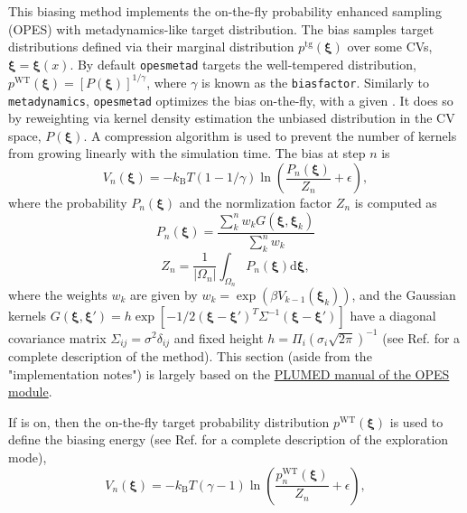 
This biasing method implements the on-the-fly probability enhanced sampling (OPES) with metadynamics-like target distribution.\cite{Invernizzi2020}
The bias samples target distributions defined via their marginal distribution
$p^{\mathrm{tg}}(\boldsymbol{\xi})$ over some CVs, $\boldsymbol{\xi} = \boldsymbol{\xi}(x)$.
By default \texttt{opes{\textunderscore}metad} targets the well-tempered distribution, $p^{\mathrm{WT}}(\boldsymbol{\xi}) = [P(\boldsymbol{\xi})]^{1/\gamma}$, where $\gamma$ is known as the \texttt{biasfactor}.
Similarly to \texttt{metadynamics}, \texttt{opes{\textunderscore}metad} optimizes the bias on-the-fly, with a given .
It does so by reweighting via kernel density estimation the unbiased distribution in the CV space, $P(\boldsymbol{\xi})$.
A compression algorithm is used to prevent the number of kernels from growing linearly with the simulation time.
The bias at step $n$ is
\begin{equation}\label{eq:opes_potential}
V_n(\boldsymbol{\xi}) = -k_{\mathrm{B}}T(1-1/\gamma)\ln\left(\frac{P_n(\boldsymbol{\xi})}{Z_n}+\epsilon\right),
\end{equation}
where the probability $P_n (\boldsymbol{\xi})$ and the normlization factor $Z_n$ is computed as
\begin{equation}
P_n (\boldsymbol{\xi}) = \frac{\sum_k^n w_k G(\boldsymbol{\xi}, \boldsymbol{\xi}_k)}{\sum_k^n w_k}
\end{equation}
\begin{equation}
Z_n = \frac{1}{|\Omega_n|}\int_{\Omega_n} P_n (\boldsymbol{\xi}) \mathrm{d}\boldsymbol{\xi},
\end{equation}
where the weights $w_k$ are given by $w_k = \exp(\beta V_{k-1}(\boldsymbol{\xi}_k))$, and the Gaussian kernels
$G(\boldsymbol{\xi}, \boldsymbol{\xi}')=h\exp\left[-1/2(\boldsymbol{\xi}-\boldsymbol{\xi}')^T \Sigma^{-1}(\boldsymbol{\xi}-\boldsymbol{\xi}')\right]$ have a diagonal covariance matrix $\Sigma_{ij}=\sigma^2 \delta_{ij}$ and fixed height $h=\Pi_i (\sigma_i \sqrt{2\pi})^{-1}$ (see Ref.\cite{Invernizzi2020} for a complete description of the method). This section (aside from the "implementation notes") is largely based on the \href{https://www.plumed.org/doc-master/user-doc/html/_o_p_e_s__m_e_t_a_d__e_x_p_l_o_r_e.html}{PLUMED manual of the OPES module}.

If  is on, then the on-the-fly target probability distribution $p^{\mathrm{WT}}(\boldsymbol{\xi})$ is used to define the biasing energy (see Ref.\cite{Invernizzi2022} for a complete description of the exploration mode),
\begin{equation}\label{eq:opes_potential_explore}
V_n (\boldsymbol{\xi})=-k_{\mathrm{B}} T(\gamma - 1)\ln{\left(\frac{p_n^{\mathrm{WT}}(\boldsymbol{\xi})}{Z_n}+\epsilon\right)},
\end{equation}


